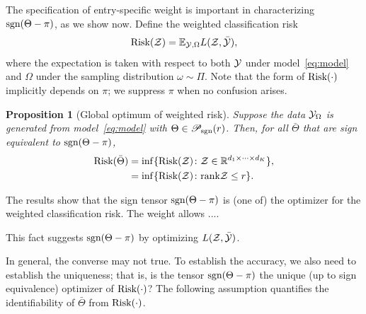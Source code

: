 \documentclass{article}
\theoremstyle{plain}
\newtheorem{prop}{Proposition}
\theoremstyle{definition}
\def\sign{\textup{sgn}}
\def\srank{\textup{srank}}
\def\caliP{\mathscr{P}_{\textup{sgn}}}
\def\risk{\textup{Risk}}
\begin{document}
The specification of entry-specific weight is important in characterizing $\sign(\Theta-\pi)$, as we show now. Define the weighted classification risk 
\begin{equation}\label{eq:population}
\textup{Risk}(\mathcal{Z})=\mathbb{E}_{\mathcal{Y},\Omega}L(\mathcal{Z},\bar{\mathcal{Y}}),
\end{equation}
where the expectation is taken with respect to both $\mathcal{Y}$ under model~\eqref{eq:model} and $\Omega$ under the sampling distribution $\omega\sim\Pi$. Note that the form of $\textup{Risk}(\cdot)$ implicitly depends on $\pi$; we suppress $\pi$ when no confusion arises. 
\begin{prop}[Global optimum of weighted risk]\label{prop:global}
Suppose the data $\mathcal{Y}_\Omega$ is generated from model~\eqref{eq:model} with $\Theta \in \caliP(r)$. Then, for all $\bar \Theta$ that are sign equivalent to $\sign(\Theta-\pi)$, 
\begin{align}
\textup{Risk}(\bar \Theta )&=\inf\{\textup{Risk}(\mathcal{Z})\colon \mathcal{Z}\in\mathbb{R}^{d_1\times \cdots \times d_K}\},\\
&=\inf\{\textup{Risk}(\mathcal{Z})\colon \textup{rank} \mathcal{Z}\leq r\}.
\end{align}
\end{prop}
The results show that the sign tensor $\sign(\Theta-\pi)$ is (one of) the optimizer for the weighted classification risk. The weight allows .... 


This fact suggests $\sign(\Theta-\pi)$ by optimizing $L(\mathcal{Z},\bar {\mathcal{Y}})$. 

In general, the converse may not true. To establish the accuracy, we also need to establish the uniqueness; that is, is the tensor $\sign(\Theta-\pi)$ the unique (up to sign equivalence) optimizer of $\risk(\cdot)$? The following assumption quantifies the identifiability of $\bar \Theta$ from $\risk(\cdot)$. 


\end{document}
